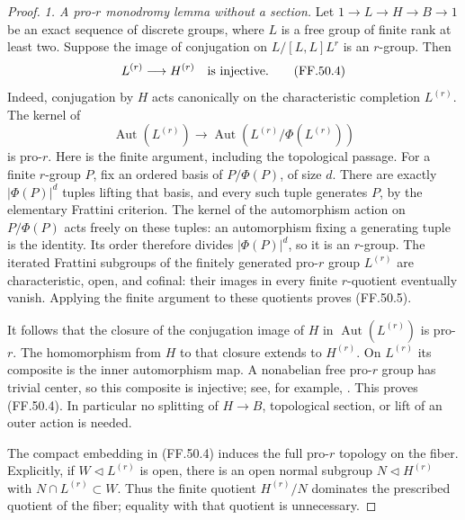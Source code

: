 \begin{proof}
\emph{1. A pro-\(r\) monodromy lemma without a section.}
Let \(1\to L\to H\to B\to1\) be an exact sequence of
discrete groups, where \(L\) is a free group of finite rank
at least two. Suppose the image of conjugation on
\(L/[L,L]L^r\) is an \(r\)-group. Then
\[
                         L^{(r)}\longrightarrow H^{(r)}
                    \quad\hbox{is injective}.             \tag{FF.50.4}
\]
Indeed, conjugation by \(H\) acts canonically on the
characteristic completion \(L^{(r)}\). The kernel of
\[
 \operatorname{Aut}(L^{(r)})\longrightarrow
 \operatorname{Aut}(L^{(r)}/\Phi(L^{(r)}))
                                                        \tag{FF.50.5}
\]
is pro-\(r\). Here is the finite argument, including the
topological passage. For a finite \(r\)-group \(P\), fix
an ordered basis of \(P/\Phi(P)\), of size \(d\).
There are exactly \(|\Phi(P)|^d\) tuples lifting that basis,
and every such tuple generates \(P\), by the elementary
Frattini criterion. The kernel of the automorphism action
on \(P/\Phi(P)\) acts freely on these tuples: an
automorphism fixing a generating tuple is the identity.
Its order therefore divides \(|\Phi(P)|^d\), so it is an
\(r\)-group. The iterated Frattini subgroups of the
finitely generated pro-\(r\) group \(L^{(r)}\) are
characteristic, open, and cofinal: their images in every
finite \(r\)-quotient eventually vanish. Applying the
finite argument to these quotients proves (FF.50.5).

It follows that the closure of the conjugation image of
\(H\) in \(\operatorname{Aut}(L^{(r)})\) is pro-\(r\).
The homomorphism from \(H\) to that closure extends to
\(H^{(r)}\). On \(L^{(r)}\) its composite is the inner
automorphism map. A nonabelian free pro-\(r\) group has
trivial center, so this composite is injective; see, for
example, \cite[Theorem~5.1, proof Case~I, and
Corollary~5.3]{FF_KochloukovaZalesskii2011}.
This proves (FF.50.4). In particular no splitting of
\(H\to B\), topological section, or lift of an outer
action is needed.

The compact embedding in (FF.50.4) induces the full
pro-\(r\) topology on the fiber. Explicitly, if
\(W\triangleleft L^{(r)}\) is open, there is an open
normal subgroup \(N\triangleleft H^{(r)}\) with
\(N\cap L^{(r)}\subset W\). Thus the finite quotient
\(H^{(r)}/N\) dominates the prescribed quotient of the
fiber; equality with that quotient is unnecessary.


\end{proof}
